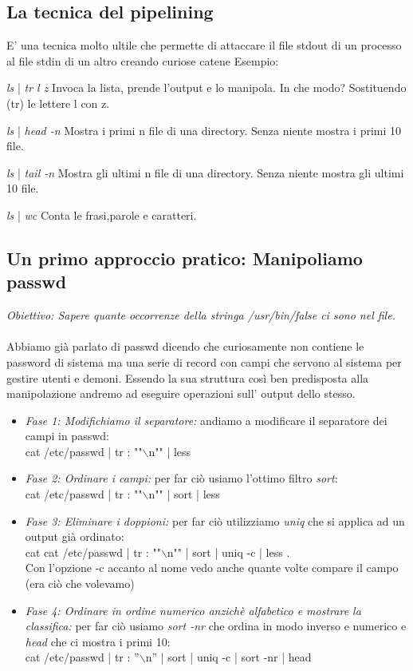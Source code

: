\documentclass[a4paper,12pt]{article} %
\begin{document}
\subsection{La tecnica del pipelining}
E' una tecnica molto ultile che permette di attaccare il file stdout di un processo al file stdin di un altro creando curiose catene
Esempio:
\begin{description}
\item \textit{ls} | \textit{tr l z} Invoca la lista, prende l'output e lo manipola. In che modo? Sostituendo (tr) le lettere l con z.
\item \textit{ls} | \textit{head -n} Mostra i primi n file di una directory. Senza niente mostra i primi 10 file.
\item \textit{ls} | \textit{tail -n} Mostra gli ultimi n file di una directory. Senza niente mostra gli ultimi 10 file.
\item \textit{ls} | \textit{wc} Conta le frasi,parole e caratteri.
\end{description}

\subsection{Un primo approccio pratico: Manipoliamo passwd}
\emph{Obiettivo: Sapere quante occorrenze della stringa /usr/bin/false ci sono nel file.} \\ \\
Abbiamo già parlato di passwd dicendo che curiosamente non contiene le password di sistema ma una serie di record con campi che servono al sistema per gestire utenti e demoni. Essendo la sua struttura così ben predisposta
alla manipolazione andremo ad eseguire operazioni sull' output dello stesso.
\begin{itemize}
\item \textit{Fase 1: Modifichiamo il separatore:} andiamo a modificare il separatore dei campi in passwd: \\ cat /etc/passwd | tr : ""$\backslash$n"" | less
\item \textit{Fase 2: Ordinare i campi:} per far ciò usiamo l'ottimo filtro \textit{sort}: \\ cat /etc/passwd | tr : ""$\backslash$n"" | sort | less
\item \textit{Fase 3: Eliminare i doppioni:} per far ciò utilizziamo \textit{uniq} che si applica ad un output già ordinato: \\ cat  cat /etc/passwd | tr : ""$\backslash$n"" | sort | uniq -c | less . \\ Con l'opzione -c accanto al nome vedo anche
								quante volte compare il campo (era ciò che volevamo)
\item \textit{Fase 4: Ordinare in ordine numerico anzichè alfabetico e mostrare la classifica:} per far ciò usiamo \textit{sort -nr} che ordina in modo inverso e numerico e \textit{head} che ci mostra i primi 10: \\ 
																	      cat  /etc/passwd | tr : ''$\backslash$n'' | sort | uniq -c | sort -nr | head															      	
\end{itemize}
\end{document}
